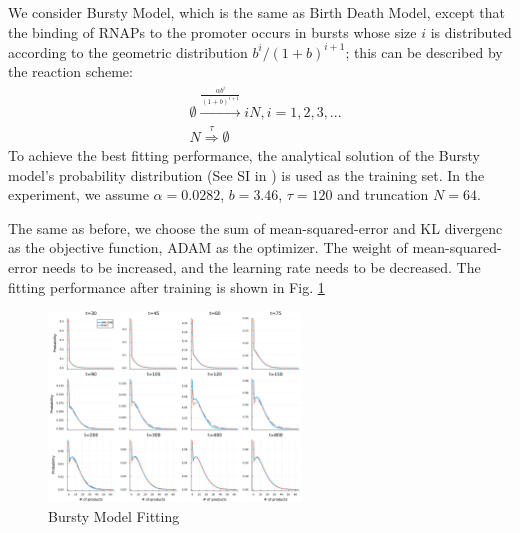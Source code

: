 \documentclass[a4paper,10pt]{article}
\begin{document}
We consider Bursty Model, which is the same as Birth Death Model, except that the binding of RNAPs to the promoter occurs in bursts whose size $i$ is distributed according to the geometric distribution $b^i/(1 + b)^{i+1}$; this can be described by the reaction scheme:
\begin{equation}\label{bursty}
	\begin{aligned}
		&\emptyset\stackrel{\frac{\alpha b^i}{(1+b)^{i+1}}}\longrightarrow iN,i=1,2,3,...\\ &N\stackrel{\tau}\Rightarrow\emptyset
	\end{aligned}
\end{equation}
To achieve the best fitting performance, the analytical solution of the Bursty model's probability distribution (See SI in \cite{jiang2021neural}) is used as the training set. In the experiment, we assume $\alpha=0.0282$, $b=3.46$, $\tau=120$ and truncation $N=64$.

The same as before, we choose the sum of mean-squared-error and KL divergenc as the  objective  function, ADAM as the optimizer. The weight of mean-squared-error needs to be increased, and the learning rate needs to be decreased. The fitting performance after training is shown in Fig. \ref{Bursty Model Fitting}
\begin{figure}[h]
	\centering
	\includegraphics[width=0.6\textwidth]{Figs/Bursty_fitting.pdf}
	\caption{Bursty Model Fitting}\label{Bursty Model Fitting}  
\end{figure}
\end{document}
